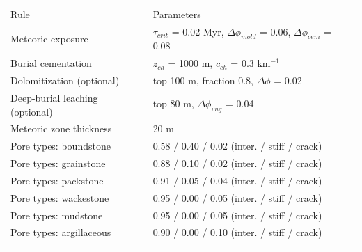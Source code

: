 \begin{tabular}{ll}
\tophline
Rule & Parameters \\
\middlehline
Meteoric exposure & $\tau_{crit}$ = 0.02 Myr, $\Delta\phi_{mold}$ = 0.06, $\Delta\phi_{cem}$ = 0.08 \\
Burial cementation & $z_{ch}$ = 1000 m, $c_{ch}$ = 0.3 km$^{-1}$ \\
Dolomitization (optional) & top 100 m, fraction 0.8, $\Delta\phi$ = 0.02 \\
Deep-burial leaching (optional) & top 80 m, $\Delta\phi_{vug}$ = 0.04 \\
Meteoric zone thickness & 20 m \\
Pore types: boundstone & 0.58 / 0.40 / 0.02 (inter. / stiff / crack) \\
Pore types: grainstone & 0.88 / 0.10 / 0.02 (inter. / stiff / crack) \\
Pore types: packstone & 0.91 / 0.05 / 0.04 (inter. / stiff / crack) \\
Pore types: wackestone & 0.95 / 0.00 / 0.05 (inter. / stiff / crack) \\
Pore types: mudstone & 0.95 / 0.00 / 0.05 (inter. / stiff / crack) \\
Pore types: argillaceous & 0.90 / 0.00 / 0.10 (inter. / stiff / crack) \\
\bottomhline
\end{tabular}
